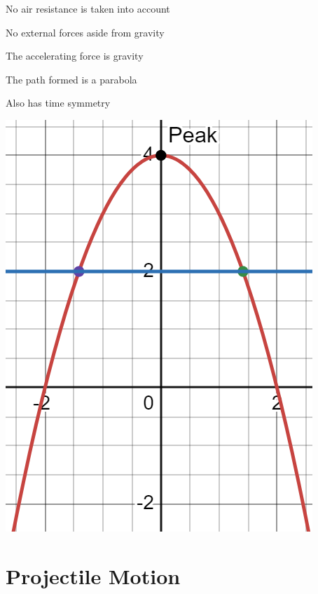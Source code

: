 \documentclass[12pt, letterpaper]{article}
\begin{document}
\setlength{\columnsep}{1cm}
\setlength{\columnseprule}{0.2pt}
\begin{multicols}{2}
    \begin{boxlabel}
        \item No air resistance is taken into account
        \item No external forces aside from gravity
        \item The accelerating force is gravity
        \item The path formed is a parabola
    \end{boxlabel}

    \noindent\centering Also has time symmetry
    
    \includegraphics[width=\textwidth / 4]{Graphs/symmetry.png}
\end{multicols}

\newpage
\noindent\section{Projectile Motion}
\end{document}
